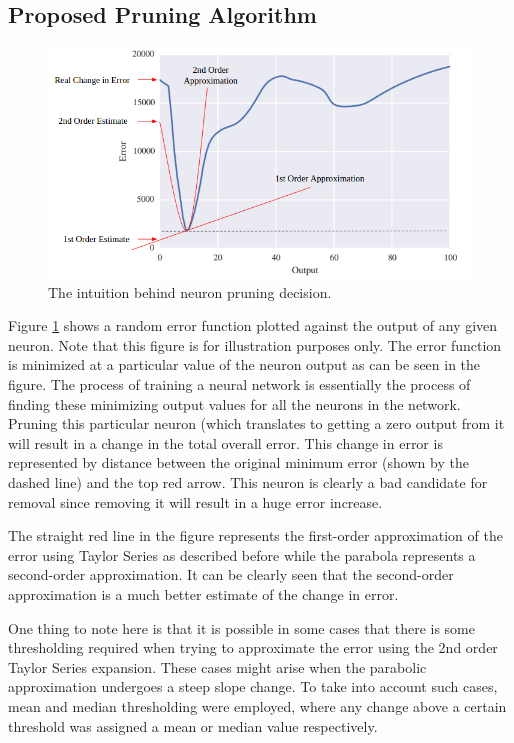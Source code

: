 \subsection{Proposed Pruning Algorithm}
\begin{figure}
  \includegraphics[width=\linewidth]{png/intuition.png}
  \caption{The intuition behind neuron pruning decision.}
  \label{fig:intuition}
\end{figure}

Figure \ref{fig:intuition} shows a random error function plotted against the output of any given neuron. Note that this figure is for illustration purposes only. The error function is minimized at a particular value of the neuron output as can be seen in the figure. The process of training a neural network is essentially the process of finding these minimizing output values for all the neurons in the network. Pruning this particular neuron (which translates to getting a zero output from it will result in a change in the total overall error. This change in error is represented by distance between the original minimum error (shown by the dashed line) and the top red arrow. This neuron is clearly a bad candidate for removal since removing it will result in a huge error increase. 

The straight red line in the figure represents the first-order approximation of the error using Taylor Series as described before while the parabola represents a second-order approximation. It can be clearly seen that the second-order approximation is a much better estimate of the change in error.

One thing to note here is that it is possible in some cases that there is some thresholding required when trying to approximate the error using the 2nd order Taylor Series expansion. These cases might arise when the parabolic approximation undergoes a steep slope change. To take into account such cases, mean and median thresholding were employed, where any change above a certain threshold was assigned a mean or median value respectively.

